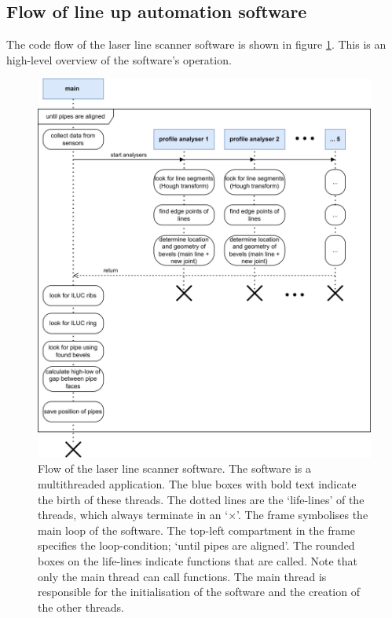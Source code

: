 \subsection{Flow of line up automation software} \label{ssec:code_flow}
The code flow of the laser line scanner software is shown in figure \ref{fig:code_flow}. This is an high-level
overview of the software's operation.
\begin{figure}[H]
    \centering
    \includegraphics[width=\textwidth]{images/automated_lineup_flow.png}
    \caption{Flow of the laser line scanner software. The software is a multithreaded application. The blue boxes
        with bold text indicate the birth of these threads. The dotted lines are the `life-lines' of the threads, which always terminate in an
        `$\times$'. The frame symbolises the main loop of the software. The top-left compartment in the frame
        specifies the loop-condition; `until pipes are aligned'. The rounded boxes on the life-lines indicate functions that are called. Note that only
        the main thread can call functions. The main thread is responsible for the initialisation of the software and the creation of the other threads.}
    \label{fig:code_flow}
\end{figure}
